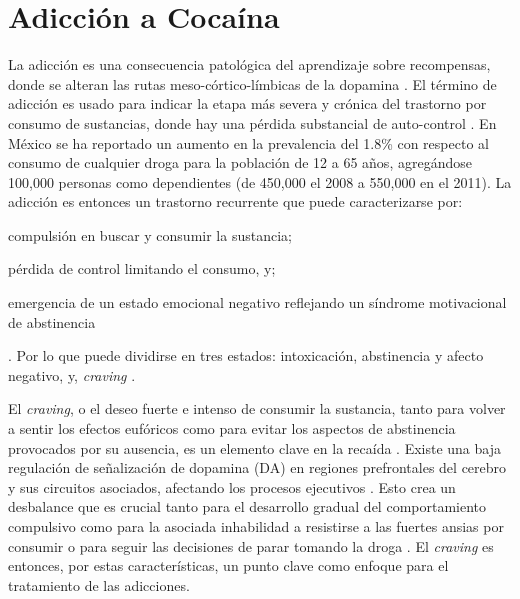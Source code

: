 \section{Adicción a Cocaína}
La adicción es una consecuencia patológica del aprendizaje sobre recompensas, donde se alteran las rutas meso-córtico-límbicas de la dopamina \parencite{Volkow2016}.
El término de adicción es usado para indicar la etapa más severa y crónica del trastorno por consumo de sustancias, donde hay una pérdida substancial de auto-control \parencite{Volkow2016}.
En México se ha reportado un aumento en la prevalencia del 1.8\% con respecto al consumo de cualquier droga para la población de 12 a 65 años, agregándose 100,000 personas como dependientes (de 450,000 el 2008 a 550,000 en el 2011)\parencite{InstitutoNacionaldePsiquiatriaRamondelaFuenteMuniz2012a}.
La adicción es entonces un trastorno recurrente que puede caracterizarse por:
\begin{enumerate*}
    \item{compulsión en buscar y consumir la sustancia; }
    \item{pérdida de control limitando el consumo, y; }
    \item{emergencia de un estado emocional negativo reflejando un síndrome motivacional de abstinencia}
\end{enumerate*}.
Por lo que puede dividirse en tres estados: intoxicación, abstinencia y afecto negativo, y, \textit{craving} \parencite{Koob2010a}.\par
El \textit{craving}, o el deseo fuerte e intenso de consumir la sustancia, tanto para volver a sentir los efectos eufóricos como para evitar los aspectos de abstinencia provocados por su ausencia, es un elemento clave en la recaída \parencite{Koob2010a}.
Existe una baja regulación de señalización de dopamina (DA) en regiones prefrontales del cerebro y sus circuitos asociados, afectando los procesos ejecutivos \parencite{Goldstein2012a}.
Esto crea un desbalance que es crucial tanto para el desarrollo gradual del comportamiento compulsivo como para la asociada inhabilidad a resistirse a las fuertes ansias por consumir o para seguir las decisiones de parar tomando la droga \parencite{Volkow2016}.
El \textit{craving} es entonces, por estas características, un punto clave como enfoque para el tratamiento de las adicciones.

